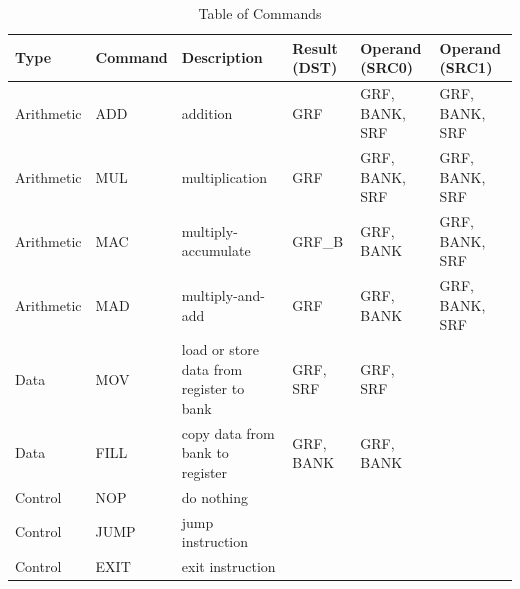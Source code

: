 \documentclass[12pt]{article}
\begin{document}
\begin{table}[h!]
	\centering
	\begin{tabular}{|>{\centering\arraybackslash}m{1.9cm}|>{\centering\arraybackslash}m{2cm}|>{\centering\arraybackslash}m{5cm}|>{\centering\arraybackslash}m{2cm}|>{\centering\arraybackslash}m{2cm}|>{\centering\arraybackslash}m{2cm}|}
		\hline
		\textbf{Type} & \textbf{Command} & \textbf{Description} & \textbf{Result (DST)} & \textbf{Operand (SRC0)} & \textbf{Operand (SRC1)} \\ 
		\hline
		Arithmetic & ADD & addition & GRF & GRF, BANK, SRF & GRF, BANK, SRF \\ 
		\hline
		Arithmetic & MUL & multiplication & GRF & GRF, BANK, SRF & GRF, BANK, SRF \\ 
		\hline
		Arithmetic & MAC & multiply-accumulate & GRF\_B & GRF, BANK & GRF, BANK, SRF \\ 
		\hline
		Arithmetic & MAD & multiply-and-add & GRF & GRF, BANK & GRF, BANK, SRF \\ 
		\hline
		Data & MOV & load or store data from register to bank & GRF, SRF & GRF, SRF & \\ 
		\hline
		Data & FILL & copy data from bank to register & GRF, BANK & GRF, BANK & \\ 
		\hline
		Control & NOP & do nothing & & & \\ 
		\hline
		Control & JUMP & jump instruction & & & \\ 
		\hline
		Control & EXIT & exit instruction & & & \\ 
		\hline
	\end{tabular}
	\caption{Table of Commands}
	\label{tab:commands}
\end{table}
\end{document}

